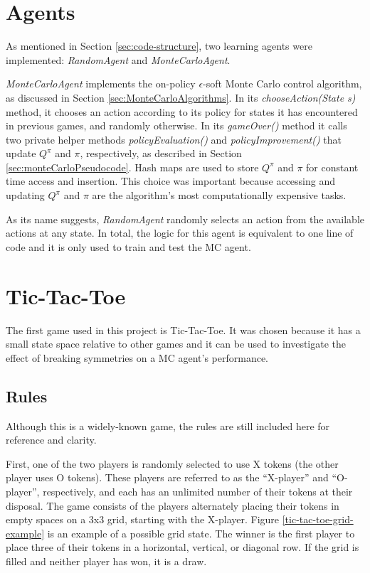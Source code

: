 \documentclass[11pt,a4paper,twoside,openright]{report}
\begin{document}
\section{Agents}
\label{sec:Agents}

As mentioned in Section \ref{sec:code-structure}, two learning agents were implemented: \emph{RandomAgent} and \emph{MonteCarloAgent}.

\emph{MonteCarloAgent} implements the on-policy $\epsilon$-soft Monte Carlo control algorithm, as discussed in Section \ref{sec:MonteCarloAlgorithms}. In its \emph{chooseAction(State s)} method, it chooses an action according to its policy for states it has encountered in previous games, and randomly otherwise. In its \emph{gameOver()} method it calls two private helper methods \emph{policyEvaluation()} and \emph{policyImprovement()} that update $Q^{\pi}$ and $\pi$, respectively, as described in Section \ref{sec:monteCarloPseudocode}. Hash maps are used to store $Q^{\pi}$ and $\pi$ for constant time access and insertion. This choice was important because accessing and updating $Q^{\pi}$ and $\pi$ are the algorithm's most computationally expensive tasks.

As its name suggests, \emph{RandomAgent} randomly selects an action from the available actions at any state. In total, the logic for this agent is equivalent to one line of code and it is only used to train and test the MC agent.


\newpage

\section{Tic-Tac-Toe}
\label{sec:TicTacToe}

The first game used in this project is Tic-Tac-Toe. It was chosen because it has a small state space relative to other games and it can be used to investigate the effect of breaking symmetries on a MC agent's performance.


\subsection{Rules}

Although this is a widely-known game, the rules \cite{tic-tac-toe-rules} are still included here for reference and clarity.

First, one of the two players is randomly selected to use X tokens (the other player uses O tokens). These players are referred to as the ``X-player'' and ``O-player'', respectively, and each has an unlimited number of their tokens at their disposal. The game consists of the players alternately placing their tokens in empty spaces on a 3x3 grid, starting with the X-player. Figure \ref{tic-tac-toe-grid-example} is an example of a possible grid state. The winner is the first player to place three of their tokens in a horizontal, vertical, or diagonal row. If the grid is filled and neither player has won, it is a draw.
\end{document}
